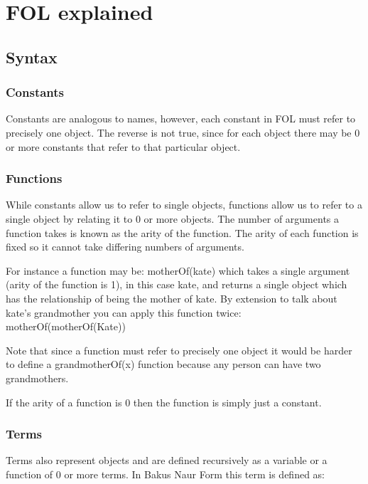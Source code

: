 \section{FOL explained}

\subsection{Syntax}

\subsubsection*{Constants}

Constants are analogous to names, however, each constant in FOL must refer to precisely one object. The reverse is not true, since for each object there may be 0 or more constants that refer to that particular object.

\subsubsection*{Functions}

While constants allow us to refer to single objects, functions allow us to refer to a single object by relating it to 0 or more objects. The number of arguments a function takes is known as the arity of the function. The arity of each function is fixed so it cannot take differing numbers of arguments. 

For instance a function may be: motherOf(kate) which takes a single argument (arity of the function is 1), in this case kate, and returns a single object which has the relationship of being the mother of kate. By extension to talk about kate's grandmother you can apply this function twice: motherOf(motherOf(Kate))

Note that since a function must refer to precisely one object it would be harder to define a grandmotherOf(x) function because any person can have two grandmothers.

If the arity of a function is 0 then the function is simply just a constant.


\subsubsection*{Terms}

Terms also represent objects and are defined recursively as a variable or a function of 0 or more terms. In Bakus Naur Form this term is defined as:

